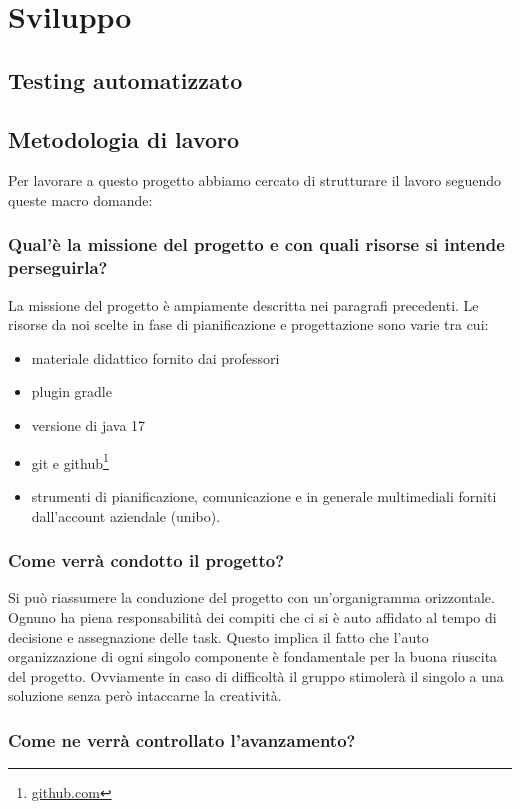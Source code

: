 \documentclass[a4paper,12pt]{report}
\begin{document}
\chapter{Sviluppo}
\section{Testing automatizzato}
\section{Metodologia di lavoro}
Per lavorare
a questo progetto abbiamo cercato di strutturare il lavoro seguendo queste macro domande:
\subsection{Qual'è la missione del progetto e con quali risorse si intende perseguirla?}
La missione del progetto è ampiamente descritta nei paragrafi precedenti.
Le risorse da noi scelte in fase di pianificazione e progettazione sono varie tra cui:
\begin{itemize}
    \item materiale didattico fornito dai professori
    \item plugin gradle
    \item versione di java 17
    \item git e github\footnote{\url{github.com}}
    \item strumenti di pianificazione, comunicazione e in generale multimediali forniti dall'account aziendale (unibo).
\end{itemize}

\subsection{Come verrà condotto il progetto?}
Si può riassumere la conduzione del progetto con un'organigramma orizzontale.
Ognuno ha piena responsabilità dei compiti che ci si è auto affidato al tempo di decisione e assegnazione delle task.
Questo implica il fatto che l'auto organizzazione di ogni singolo componente è fondamentale per la buona riuscita del progetto.
Ovviamente in caso di difficoltà il gruppo stimolerà il singolo a una soluzione senza però intaccarne la creatività.
\subsection{Come ne verrà controllato l'avanzamento?}
\end{document}
